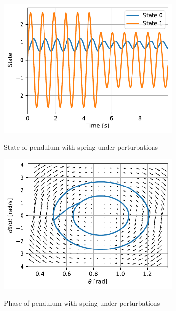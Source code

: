 \documentclass{cmc}
\begin{document}
\begin{figure}[H]
  \centering
  \begin{subfigure}[b]{0.49\textwidth}
    { \centering
      \includegraphics[width=\textwidth]{figures/State_Limit_Cycle(x0_=_[0dot5,_0dot1]).pdf}
      \label{fig:spring_state}
    }
    \caption{State of pendulum with spring under perturbations}
  \end{subfigure}
  \begin{subfigure}[b]{0.49\textwidth}
    { \centering
      \includegraphics[width=\textwidth]{figures/Phase_Limit_Cycle(x0_=_[0dot5,_0dot1]).pdf}
      \label{fig:spring_phase}
    }
    \caption{Phase of pendulum with spring under perturbations}
  \end{subfigure}
  \caption{}
  \label{fig:pendulum-spring-limit-cycle}
\end{figure}
\end{document}
